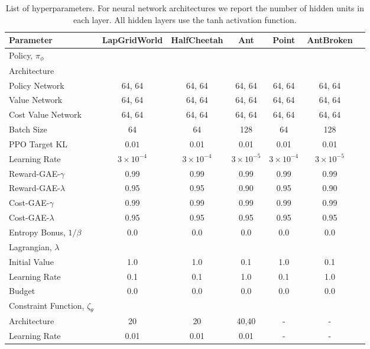 \begin{table}[th]
\caption{List of hyperparameters. For neural network architectures we report the number of hidden units in each layer. All hidden layers use the tanh activation function.}
\label{table:hp}
\vskip 0.15in
\begin{center}
\begin{small}
\begin{sc}
\begin{tabular}{lcccccr}
\toprule
Parameter & LapGridWorld & HalfCheetah & Ant & Point & AntBroken\\
\midrule
Policy, $\pi_\phi$\\
\;\;\;\;Architecture       & \\
\;\;\;\;\;\;\;Policy Network & 64, 64 & 64, 64 &64, 64& 64, 64 & 64, 64 \\
\;\;\;\;\;\;\;Value Network & 64, 64 & 64, 64 &64, 64& 64, 64 & 64, 64 \\
\;\;\;\;\;\;\;Cost Value Network & 64, 64 & 64, 64 &64, 64& 64, 64 & 64, 64 \\
\;\;\;\;Batch Size      & 64   & 64   & 128  & 64   & 128\\
\;\;\;\;PPO Target KL   & $0.01$ & 0.01 & 0.01 & 0.01 & 0.01\\
\;\;\;\;Learning Rate   & $3 \times 10^{-4}$  & $3 \times 10^{-4}$  & $3 \times 10^{-5}$  & $3 \times 10^{-4}$  & $3 \times 10^{-5}$ \\
\;\;\;\;Reward-GAE-$\gamma$      & 0.99 & 0.99 & 0.99 & 0.99 & 0.99\\
\;\;\;\;Reward-GAE-$\lambda$     & 0.95 & 0.95 & 0.90 & 0.95 & 0.90\\
\;\;\;\;Cost-GAE-$\gamma$        & 0.99 & 0.99 & 0.99 & 0.99 & 0.99\\
\;\;\;\;Cost-GAE-$\lambda$       & 0.95 & 0.95 & 0.95 & 0.95 & 0.95\\
\;\;\;\;Entropy Bonus, $1/\beta$ & 0.0  & 0.0  & 0.0  & 0.0  & 0.0\\
Lagrangian, $\lambda$\\
\;\;\;\;Initial Value  & 1.0 & 1.0 & 0.1 & 1.0 & 0.1\\
\;\;\;\;Learning Rate  & 0.1 & 0.1 & 1.0 & 0.1 & 1.0\\
\;\;\;\;Budget         & 0.0 & 0.0 & 0.0 & 0.0 & 0.0\\
Constraint Function, $\zeta_\theta$\\
\;\;\;\;Architecture                    & 20   & 20   & 40,40 & - & -\\
\;\;\;\;Learning Rate                   & 0.01 & 0.01 & 0.01  & - & -\\

\end{tabular}
\end{sc}
\end{small}
\end{center}
\end{table}
